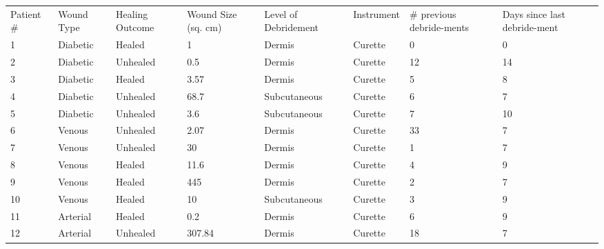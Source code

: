 \begin{table}[]
\begin{tabular}{llllllll}
Patient \# & Wound Type & Healing Outcome & Wound Size (sq. cm) & Level of Debridement & Instrument    & \# previous debride-ments & Days since last debride-ment \\
1          & Diabetic   & Healed          & 1                   & Dermis               & Curette       & 0                         & 0                            \\
2          & Diabetic   & Unhealed        & 0.5                 & Dermis               & Curette       & 12                        & 14                           \\
3          & Diabetic   & Healed          & 3.57                & Dermis               & Curette       & 5                         & 8                            \\
4          & Diabetic   & Unhealed        & 68.7                & Subcutaneous         & Curette       & 6                         & 7                            \\
5          & Diabetic   & Unhealed        & 3.6                 & Subcutaneous         & Curette       & 7                         & 10                           \\
6          & Venous     & Unhealed        & 2.07                & Dermis               & Curette       & 33                        & 7                            \\
7          & Venous     & Unhealed        & 30                  & Dermis               & Curette       & 1                         & 7                            \\
8          & Venous     & Healed          & 11.6                & Dermis               & Curette       & 4                         & 9                            \\
9          & Venous     & Healed          & 445                 & Dermis               & Curette       & 2                         & 7                            \\
10         & Venous     & Healed          & 10                  & Subcutaneous         & Curette       & 3                         & 9                            \\
11         & Arterial   & Healed          & 0.2                 & Dermis               & Curette       & 6                         & 9                            \\
12         & Arterial   & Unhealed        & 307.84              & Dermis               & Curette       & 18                        & 7                            \\

\end{tabular}
\end{table}
